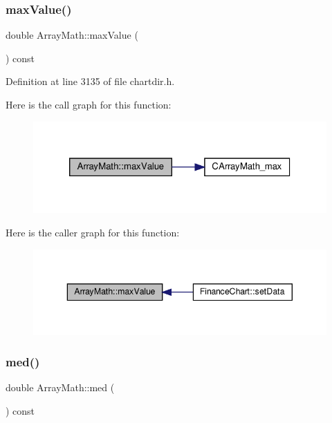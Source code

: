 \subsubsection{\texorpdfstring{max\+Value()}{maxValue()}}
{\footnotesize\ttfamily double Array\+Math\+::max\+Value (\begin{DoxyParamCaption}{ }\end{DoxyParamCaption}) const\hspace{0.3cm}{\ttfamily [inline]}}



Definition at line 3135 of file chartdir.\+h.

Here is the call graph for this function\+:
\nopagebreak
\begin{figure}[H]
\begin{center}
\leavevmode
\includegraphics[width=320pt]{class_array_math_ab2f502a58518cfe68bcdaa31729d4a96_cgraph}
\end{center}
\end{figure}
Here is the caller graph for this function\+:
\nopagebreak
\begin{figure}[H]
\begin{center}
\leavevmode
\includegraphics[width=343pt]{class_array_math_ab2f502a58518cfe68bcdaa31729d4a96_icgraph}
\end{center}
\end{figure}
\mbox{\label{class_array_math_aa60ced676c9387a970df6468379d1f56}} 
\subsubsection{\texorpdfstring{med()}{med()}}
{\footnotesize\ttfamily double Array\+Math\+::med (\begin{DoxyParamCaption}{ }\end{DoxyParamCaption}) const\hspace{0.3cm}{\ttfamily [inline]}}



